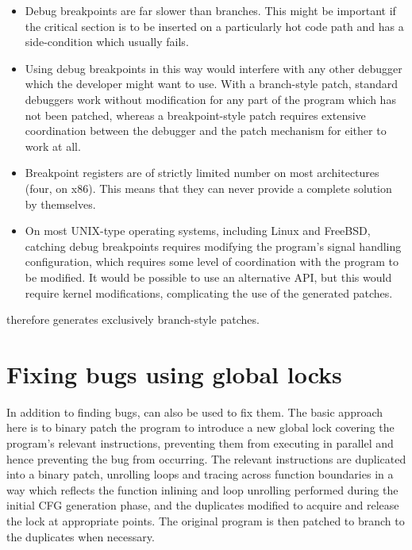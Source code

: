 \begin{itemize}
\item
  Debug breakpoints are far slower than branches.  This might be
  important if the critical section is to be inserted on
  a particularly hot code path and has a side-condition which usually
  fails.
\item
  Using debug breakpoints in this way would interfere with any other
  debugger which the developer might want to use.  With a branch-style
  patch, standard debuggers work without modification for any part of
  the program which has not been patched, whereas a breakpoint-style
  patch requires extensive coordination between the debugger and the
  patch mechanism for either to work at all.
\item
  Breakpoint registers are of strictly limited number on most
  architectures (four, on x86).  This means that they can never
  provide a complete solution by themselves.
\item
  On most UNIX-type operating systems, including Linux and FreeBSD,
  catching debug breakpoints requires modifying the program's signal
  handling configuration, which requires some level of coordination
  with the program to be modified.  It would be possible to use an
  alternative API, but this would require kernel modifications,
  complicating the use of the generated patches.
\end{itemize}

{\Implementation} therefore generates exclusively branch-style patches.



\section{Fixing bugs using global locks}
\label{sect:fix_global_lock}

In addition to finding bugs, {\technique} can also be used to fix
them.  The basic approach here is to binary patch the program to
introduce a new global lock covering the program's relevant
instructions, preventing them from executing in parallel and hence
preventing the bug from occurring.  The relevant instructions are
duplicated into a binary patch, unrolling loops and tracing across
function boundaries in a way which reflects the function inlining and
loop unrolling performed during the initial CFG generation phase, and
the duplicates modified to acquire and release the lock at appropriate
points.  The original program is then patched to branch to the
duplicates when necessary.

